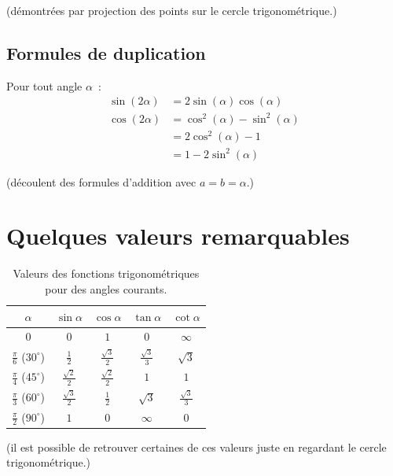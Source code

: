 \documentclass{article}
\begin{document}
(démontrées par projection des points sur le cercle trigonométrique.)

\subsection{Formules de duplication}  
Pour tout angle $\alpha$~:  
\begin{align*}  
    \sin(2\alpha) &= 2\sin(\alpha)\cos(\alpha) \\
    \cos(2\alpha) &= \cos^2(\alpha) - \sin^2(\alpha) \\
                  &= 2\cos^2(\alpha) - 1 \\
                  & = 1 - 2\sin^2(\alpha)
\end{align*}

(découlent des formules d'addition avec $a = b = \alpha$.)

\section{Quelques valeurs remarquables}

\begin{table}[h]
\centering
\renewcommand{\arraystretch}{1.3} %
\begin{tabular}{c|cccc}
\toprule
$\alpha$ & $\sin\alpha$ & $\cos\alpha$ & $\tan\alpha$ & $\cot\alpha$ \\
\midrule
$0$ & $0$ & $1$ & $0$ & $\infty$ \\[6pt] %
$\frac{\pi}{6}$ ($30^\circ$) & $\frac{1}{2}$ & $\frac{\sqrt{3}}{2}$ & $\frac{\sqrt{3}}{3}$ & $\sqrt{3}$ \\[6pt]
$\frac{\pi}{4}$ ($45^\circ$) & $\frac{\sqrt{2}}{2}$ & $\frac{\sqrt{2}}{2}$ & $1$ & $1$ \\[6pt]
$\frac{\pi}{3}$ ($60^\circ$) & $\frac{\sqrt{3}}{2}$ & $\frac{1}{2}$ & $\sqrt{3}$ & $\frac{\sqrt{3}}{3}$ \\[6pt]
$\frac{\pi}{2}$ ($90^\circ$) & $1$ & $0$ & $\infty$ & $0$ \\
\bottomrule
\end{tabular}
\caption{Valeurs des fonctions trigonométriques pour des angles courants.}
\end{table}

(il est possible de retrouver certaines de ces valeurs juste en regardant le cercle trigonométrique.)
\end{document}

